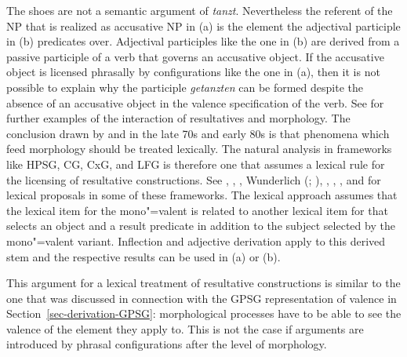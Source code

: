 \zl
The shoes are not a semantic argument of \emph{tanzt}. Nevertheless the referent of the NP that is realized as
accusative NP in (a) is the element the adjectival participle in (b) predicates
over. Adjectival participles like the one in (b) are derived from a passive participle of a
verb that governs an accusative object. If the accusative object is licensed phrasally by
configurations like the one in (a), then it is not possible to explain why the participle \emph{getanzten}
can be formed despite the absence of an accusative object in the valence specification of the verb. See  for
further examples of the interaction of resultatives and morphology.
The conclusion drawn by \citet[]{Dowty78a}
and \citet[]{Bresnan82a} in the late 70s and early 80s is that phenomena which feed morphology should be treated
lexically. The natural analysis in frameworks like HPSG, CG, CxG, and LFG is therefore one that assumes
a lexical rule for the licensing of resultative constructions. See
, , , Wunderlich (\citeyear[]{Wunderlich92a-u}; \citeyear[--126]{Wunderlich97c}), ,
 , , and  for lexical proposals in some of
 these frameworks. The lexical approach assumes that the lexical item for the mono"=valent  is related to
 another lexical item for  that selects an object and a result predicate in addition to
 the subject selected by the mono"=valent variant. Inflection and adjective derivation apply to this
 derived stem and the respective results can be used in (a) or (b).

This argument for a lexical treatment of resultative constructions is similar to the one that was discussed in connection with the GPSG representation of
valence in Section~\ref{sec-derivation-GPSG}: morphological processes have to be able to see the valence of the element
they apply to. This is not the case if arguments are introduced by phrasal configurations after the
level of morphology.

